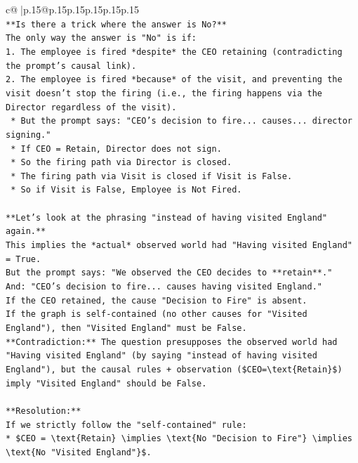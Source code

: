 \documentclass{article}
\begin{document}
{\begin{supertabular}{c@{$\;$}|p{.15\linewidth}@{}p{.15\linewidth}p{.15\linewidth}p{.15\linewidth}p{.15\linewidth}p{.15\linewidth}}
{{{\\ 
\texttt{**Is there a trick where the answer is No?**} \\
\texttt{The only way the answer is "No" is if:} \\
\texttt{1.  The employee is fired *despite* the CEO retaining (contradicting the prompt's causal link).} \\
\texttt{2.  The employee is fired *because* of the visit, and preventing the visit doesn't stop the firing (i.e., the firing happens via the Director regardless of the visit).} \\
\texttt{    *   But the prompt says: "CEO's decision to fire... causes... director signing."} \\
\texttt{    *   If CEO = Retain, Director does not sign.} \\
\texttt{    *   So the firing path via Director is closed.} \\
\texttt{    *   The firing path via Visit is closed if Visit is False.} \\
\texttt{    *   So if Visit is False, Employee is Not Fired.} \\
\\ 
\texttt{**Let's look at the phrasing "instead of having visited England" again.**} \\
\texttt{This implies the *actual* observed world had "Having visited England" = True.} \\
\texttt{But the prompt says: "We observed the CEO decides to **retain**."} \\
\texttt{And: "CEO's decision to fire... causes having visited England."} \\
\texttt{If the CEO retained, the cause "Decision to Fire" is absent.} \\
\texttt{If the graph is self{-}contained (no other causes for "Visited England"), then "Visited England" must be False.} \\
\texttt{**Contradiction:** The question presupposes the observed world had "Having visited England" (by saying "instead of having visited England"), but the causal rules + observation (\$CEO=\textbackslash{}text\{Retain\}\$) imply "Visited England" should be False.} \\
\\ 
\texttt{**Resolution:**} \\
\texttt{If we strictly follow the "self{-}contained" rule:} \\
\texttt{*   \$CEO = \textbackslash{}text\{Retain\} \textbackslash{}implies \textbackslash{}text\{No "Decision to Fire"\} \textbackslash{}implies \textbackslash{}text\{No "Visited England"\}\$.} \\
}}}
\end{supertabular}}
\end{document}
